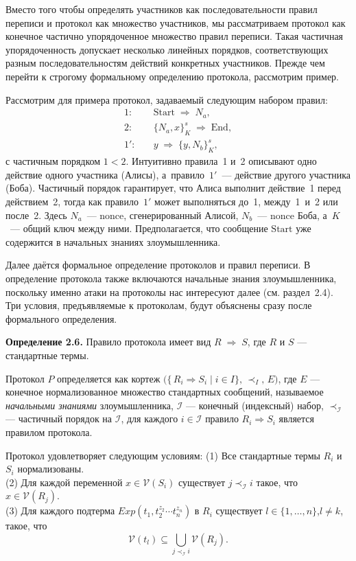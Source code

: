 Вместо того чтобы определять участников как последовательности правил переписи и протокол как множество участников, мы рассматриваем протокол как конечное частично упорядоченное множество правил переписи. Такая частичная упорядоченность допускает несколько линейных порядков, соответствующих разным последовательностям действий конкретных участников. Прежде чем перейти к строгому формальному определению протокола, рассмотрим пример.

Рассмотрим для примера протокол, задаваемый следующим набором правил:
\[
\begin{aligned}
1:\quad &\mathrm{Start}\;\Rightarrow\;N_{a},\\
2:\quad &\{N_{a},x\}^{s}_{K}\;\Rightarrow\;\mathrm{End},\\
1':\quad &y\;\Rightarrow\;\{y,N_{b}\}^{s}_{K},
\end{aligned}
\]
с частичным порядком \(1<2\). Интуитивно правила 1 и 2 описывают одно действие одного участника (Алисы), а правило $1'$ — действие другого участника (Боба). Частичный порядок гарантирует, что Алиса выполнит действие 1 перед действием 2, тогда как правило $1'$ может выполняться до 1, между 1 и 2 или после 2. Здесь \(N_{a}\) — nonce, сгенерированный Алисой, \(N_{b}\) — nonce Боба, а \(K\) — общий ключ между ними. Предполагается, что сообщение \(\mathrm{Start}\) уже содержится в начальных знаниях злоумышленника.

Далее даётся формальное определение протоколов и правил переписи. В определение протокола также включаются начальные знания злоумышленника, поскольку именно атаки на протоколы нас интересуют далее (см. раздел 2.4). Три условия, предъявляемые к протоколам, будут объяснены сразу после формального определения.

\medskip
\noindent\textbf{Определение 2.6.} Правило протокола имеет вид $R \;\Rightarrow\; S$, где $R$ и $S$ — стандартные термы.

Протокол $P$ определяется как кортеж $\bigl(\{\,R_i \Rightarrow S_i \mid i\in I\},\,\prec_I,\,E\bigr)$, где $E$ — конечное нормализованное множество
стандартных сообщений, называемое \emph{начальными знаниями} злоумышленника, $\mathcal{I}$ — конечный (индексный) набор, $\prec_\mathcal{I}$ — частичный порядок на $\mathcal{I}$,
для каждого $i\in \mathcal{I}$ правило $R_i\Rightarrow S_i$ является правилом протокола.

Протокол удовлетворяет следующим условиям:
(1) Все стандартные термы $R_i$ и $S_i$ нормализованы.\\
(2) Для каждой переменной $x\in \mathcal{V}(S_i)$ существует $j\prec_\mathcal{I} i$ такое, что $x\in \mathcal{V}(R_j)$.\\
(3) Для каждого подтерма $Exp(t_1,t_2^{z_2}\!\cdots t_n^{z_n})$ в $R_i$ существует $l\in\{1,\dots,n\}$,\quad $l\neq k$, такое, что
\[
  \mathcal{V}(t_l)\subseteq\bigcup_{j\prec_\mathcal{I} i}\mathcal{V}(R_j).
\]

